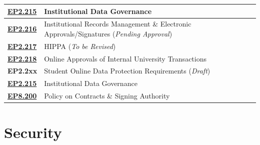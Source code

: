 \begin{frame}
{{\begin{tabular}{l||l}
        \midrule
        \href{https://www.hawaii.edu/policy/?action=viewPolicy\&policySection=ep\&policyChapter=2\&policyNumber=215\&menuView=closed}{\textbf{EP2.215}} & Institutional Data Governance \\
        \midrule
        \href{https://www.hawaii.edu/policy/?action=viewPolicy\&policySection=ep\&policyChapter=2\&policyNumber=216\&menuView=closed}{\textbf{EP2.216}} & Institutional Records Management \& Electronic Approvals/Signatures (\textit{Pending Approval}) \\
        \midrule
        \href{https://www.hawaii.edu/policy/?action=viewPolicy\&policySection=ep\&policyChapter=2\&policyNumber=217\&menuView=closed}{\textbf{EP2.217}} & HIPPA (\textit{To be Revised}) \\
        \midrule
        \href{https://www.hawaii.edu/policy/?action=viewPolicy\&policySection=ep\&policyChapter=2\&policyNumber=218\&menuView=closed}{\textbf{EP2.218}} & Online Approvals of Internal University Transactions\\
        \midrule
        \textbf{EP2.2xx} & Student Online Data Protection Requirements (\textit{Draft}) \\
        \midrule
        \href{https://www.hawaii.edu/policy/?action=viewPolicy\&policySection=ep\&policyChapter=2\&policyNumber=215\&menuView=closed}{\textbf{EP2.215}} & Institutional Data Governance \\
        \midrule
        \href{https://www.hawaii.edu/policy/?action=viewPolicy\&policySection=ep\&policyChapter=8\&policyNumber=200\&menuView=closed}{\textbf{EP8.200}} & Policy on Contracts \& Signing Authority \\
        \bottomrule
      \end{tabular}%
      }
}
\vspace{-5pt}


\end{frame}  



\section[Security]{Security}


